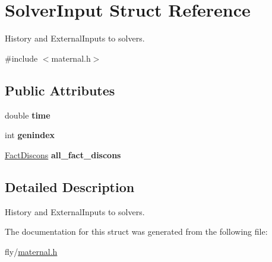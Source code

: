 \hypertarget{structSolverInput}{
\section{SolverInput Struct Reference}
\label{structSolverInput}
}


History and ExternalInputs to solvers.  


{\ttfamily \#include $<$maternal.h$>$}\subsection*{Public Attributes}
\begin{DoxyCompactItemize}
\item 
\hypertarget{structSolverInput_a07f8c427c3e62dfee6b4c40212dcc7ff}{
double {\bfseries time}}
\label{structSolverInput_a07f8c427c3e62dfee6b4c40212dcc7ff}

\item 
\hypertarget{structSolverInput_af89e6c7ee32bcb85976095ce7c11c204}{
int {\bfseries genindex}}
\label{structSolverInput_af89e6c7ee32bcb85976095ce7c11c204}

\item 
\hypertarget{structSolverInput_a7ebfee3fc7f87de240004bf294632897}{
\hyperlink{structFactDiscons}{FactDiscons} {\bfseries all\_\-fact\_\-discons}}
\label{structSolverInput_a7ebfee3fc7f87de240004bf294632897}

\end{DoxyCompactItemize}


\subsection{Detailed Description}
History and ExternalInputs to solvers. 

The documentation for this struct was generated from the following file:\begin{DoxyCompactItemize}
\item 
fly/\hyperlink{maternal_8h}{maternal.h}\end{DoxyCompactItemize}
